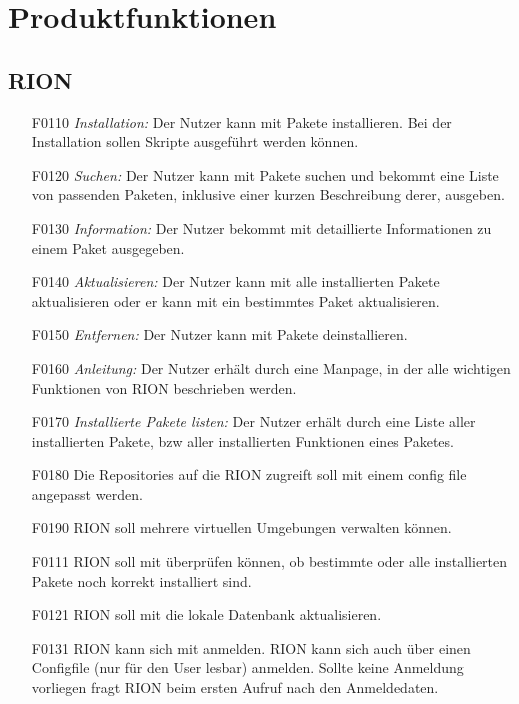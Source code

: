 \chapter{Produktfunktionen}

\section{RION}

\begin{itemize}
	\item[F0110] \textit{Installation:} Der Nutzer kann mit  Pakete installieren. Bei der Installation sollen Skripte ausgeführt werden können.
	\item[F0120] \textit{Suchen:} Der Nutzer kann mit  Pakete suchen und bekommt eine Liste von passenden Paketen, inklusive einer kurzen Beschreibung derer, ausgeben.
	\item[F0130] \textit{Information:} Der Nutzer bekommt mit  detaillierte Informationen zu einem Paket ausgegeben.
	\item[F0140] \textit{Aktualisieren:} Der Nutzer kann mit  alle installierten Pakete aktualisieren oder er kann mit  ein bestimmtes Paket aktualisieren.
	\item[F0150] \textit{Entfernen:} Der Nutzer kann mit  Pakete deinstallieren.
	\item[F0160] \textit{Anleitung:} Der Nutzer erhält durch  eine Manpage, in der alle wichtigen Funktionen von RION beschrieben werden.
	\item[F0170] \textit{Installierte Pakete listen:} Der Nutzer erhält durch  eine Liste aller installierten Pakete, bzw aller installierten Funktionen eines Paketes.
	\item[F0180] Die Repositories auf die RION zugreift soll mit einem config file angepasst werden.
	\item[F0190] RION soll mehrere virtuellen Umgebungen verwalten können.
	\item[F0111] RION soll mit 	 überprüfen können, ob bestimmte oder alle installierten Pakete noch korrekt installiert sind.
	\item[F0121] RION soll mit  die lokale Datenbank aktualisieren.
	\item[F0131] RION kann sich mit  anmelden. RION kann sich auch über einen Configfile (nur für den User lesbar) anmelden. Sollte keine Anmeldung vorliegen fragt RION beim ersten Aufruf nach den Anmeldedaten.
\end{itemize}

